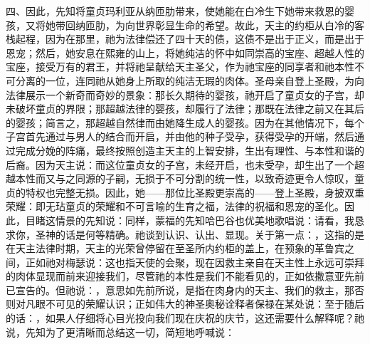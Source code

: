 四、因此，先知将童贞玛利亚从纳匝肋带来，使她能在白冷生下她带来救恩的婴孩，又将她带回纳匝肋，为向世界彰显生命的希望。故此，天主的约柜从白冷的客栈起程，因为在那里，祂为法律偿还了四十天的债，这债不是出于正义，而是出于恩宠；然后，她安息在熙雍的山上，将她纯洁的怀中如同崇高的宝座、超越人性的宝座，接受万有的君王，并将祂呈献给天主圣父，作为祂宝座的同享者和祂本性不可分离的一位，连同祂从她身上所取的纯洁无瑕的肉体。圣母亲自登上圣殿，为向法律展示一个新奇而奇妙的景象：那长久期待的婴孩，祂开启了童贞女的子宫，却未破坏童贞的界限；那超越法律的婴孩，却履行了法律；那既在法律之前又在其后的婴孩；简言之，那超越自然律而由她降生成人的婴孩。因为在其他情况下，每个子宫首先通过与男人的结合而开启，并由他的种子受孕，获得受孕的开端，然后通过完成分娩的阵痛，最终按照创造主天主的上智安排，生出有理性、与本性和谐的后裔。因为天主说：而这位童贞女的子宫，未经开启，也未受孕，却生出了一个超越本性而又与之同源的子嗣，无损于不可分割的统一性，以致奇迹更令人惊叹，童贞的特权也完整无损。因此，她——那位比圣殿更崇高的——登上圣殿，身披双重荣耀：即无玷童贞的荣耀和不可言喻的生育之福，法律的祝福和恩宠的圣化。因此，目睹这情景的先知说：同样，蒙福的先知哈巴谷也优美地歌唱说：请看，我恳求你，圣神的话是何等精确。祂谈到认识、认出、显现。关于第一点：，这指的是在天主法律时期，天主的光荣曾停留在至圣所内约柜的盖上，在预象的革鲁宾之间，正如祂对梅瑟说：这也指天使的会聚，现在因救主亲自在天主性上永远可崇拜的肉体显现而前来迎接我们，尽管祂的本性是我们不能看见的，正如依撒意亚先前已宣告的。但祂说：，意思如先前所说，是指在肉身内的天主、我们的救主，那否则对凡眼不可见的荣耀认识；正如伟大的神圣奥秘诠释者保禄在某处说：至于随后的话：，如果人仔细将心目光投向我们现在庆祝的庆节，这还需要什么解释呢？祂说，先知为了更清晰而总结这一切，简短地呼喊说：\par

